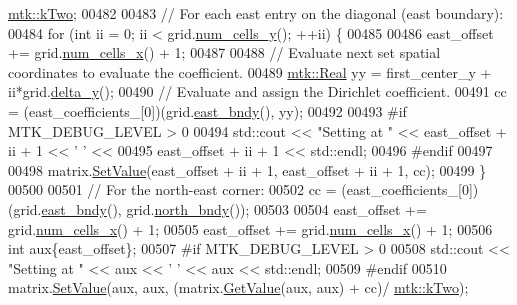 \begin{DoxyCode}
      \hyperlink{group__c01-roots_gaf39c2d851a2db744f4feb1c5ab3ec2cf}{mtk::kTwo};
00482 
00483     \textcolor{comment}{// For each east entry on the diagonal (east boundary):}
00484     \textcolor{keywordflow}{for} (\textcolor{keywordtype}{int} ii = 0; ii < grid.\hyperlink{classmtk_1_1UniStgGrid2D_aed05a801cc9a76dba0ff203cea58a61a}{num\_cells\_y}(); ++ii) \{
00485 
00486       east\_offset += grid.\hyperlink{classmtk_1_1UniStgGrid2D_a2d182866a398aba8e4829590e85bf939}{num\_cells\_x}() + 1;
00487 
00488       \textcolor{comment}{// Evaluate next set spatial coordinates to evaluate the coefficient.}
00489       \hyperlink{group__c01-roots_gac080bbbf5cbb5502c9f00405f894857d}{mtk::Real} yy = first\_center\_y + ii*grid.\hyperlink{classmtk_1_1UniStgGrid2D_a65a78cfc80ffdbeb282ed57af4dc5cb4}{delta\_y}();
00490       \textcolor{comment}{// Evaluate and assign the Dirichlet coefficient.}
00491       cc = (east\_coefficients\_[0])(grid.\hyperlink{classmtk_1_1UniStgGrid2D_a03f689eb29a6369b82ce1207c655d5ff}{east\_bndy}(), yy);
00492 
00493 \textcolor{preprocessor}{      #if MTK\_DEBUG\_LEVEL > 0}
00494       std::cout << \textcolor{stringliteral}{"Setting at "} << east\_offset + ii + 1 << \textcolor{charliteral}{' '} <<
00495         east\_offset + ii + 1 << std::endl;
00496 \textcolor{preprocessor}{      #endif}
00497 
00498       matrix.\hyperlink{classmtk_1_1DenseMatrix_a784ce5784109ac86bfb9d8562b334b13}{SetValue}(east\_offset + ii + 1, east\_offset + ii + 1, cc);
00499     \}
00500 
00501     \textcolor{comment}{// For the north-east corner:}
00502     cc = (east\_coefficients\_[0])(grid.\hyperlink{classmtk_1_1UniStgGrid2D_a03f689eb29a6369b82ce1207c655d5ff}{east\_bndy}(), grid.\hyperlink{classmtk_1_1UniStgGrid2D_afe1ead253cdeb5503e0489eba8fd84e2}{north\_bndy}());
00503 
00504     east\_offset += grid.\hyperlink{classmtk_1_1UniStgGrid2D_a2d182866a398aba8e4829590e85bf939}{num\_cells\_x}() + 1;
00505     east\_offset += grid.\hyperlink{classmtk_1_1UniStgGrid2D_a2d182866a398aba8e4829590e85bf939}{num\_cells\_x}() + 1;
00506     \textcolor{keywordtype}{int} aux\{east\_offset\};
00507 \textcolor{preprocessor}{    #if MTK\_DEBUG\_LEVEL > 0}
00508     std::cout << \textcolor{stringliteral}{"Setting at "} << aux << \textcolor{charliteral}{' '} << aux << std::endl;
00509 \textcolor{preprocessor}{    #endif}
00510     matrix.\hyperlink{classmtk_1_1DenseMatrix_a784ce5784109ac86bfb9d8562b334b13}{SetValue}(aux, aux, (matrix.\hyperlink{classmtk_1_1DenseMatrix_a4b23ecbebd970b5eea915dbb50691024}{GetValue}(aux, aux) + cc)/
      \hyperlink{group__c01-roots_gaf39c2d851a2db744f4feb1c5ab3ec2cf}{mtk::kTwo});

\end{DoxyCode}
